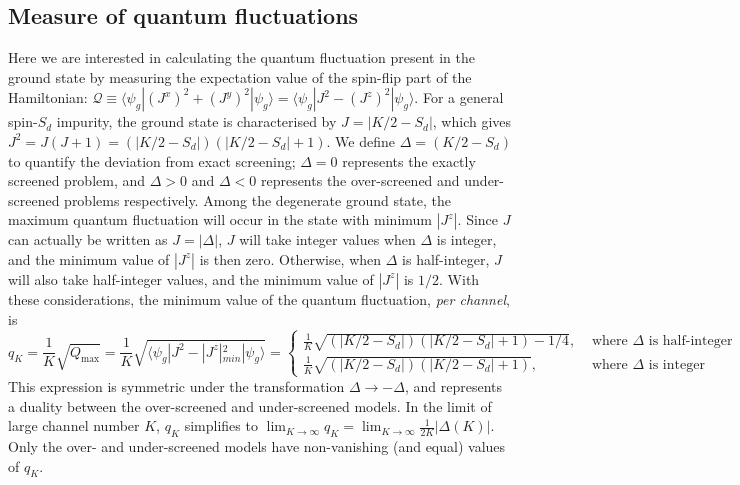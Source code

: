 \documentclass[reprint,onecolumn,prb,superscriptaddress]{revtex4-2}
\begin{document}
\subsection{Measure of quantum fluctuations}
Here we are interested in calculating the quantum fluctuation present in the  ground state by measuring the expectation value of the spin-flip part of the Hamiltonian: ${\mathcal{Q}}\equiv \langle \psi_g | (J^x)^2+(J^y)^2 |\psi_g\rangle = \langle \psi_g | J^2 - (J^z)^2 |\psi_g\rangle$. For a general spin-$S_d$ impurity, the ground state is characterised by $J=|K/2-S_d|$, which gives $J^2=J(J+1)=(|K/2-S_d|)(|K/2-S_d|+1)$. We define $\Delta=(K/2-S_d)$ to quantify the deviation from exact screening; $\Delta=0$ represents the exactly screened problem, and $\Delta>0$ and $\Delta<0$ represents the over-screened and under-screened problems respectively. Among the degenerate ground state, the maximum quantum fluctuation will occur in the state with minimum \(|J^z|\). Since \(J\) can actually be written as \(J = |\Delta|\), \(J\) will take integer values when \(\Delta\) is integer, and the minimum value of \(|J^z|\) is then zero. Otherwise, when \(\Delta\) is half-integer, \(J\) will also take half-integer values, and the minimum value of \(|J^z|\) is \(1/2\). With these considerations, the minimum value of the quantum fluctuation, {\it per channel}, is
\begin{equation}
q_K = \frac{1}{K}\sqrt{Q_\text{max}} = \frac{1}{K}\sqrt{\langle \psi_g | J^2 - |J^z|_{min}^2 |\psi_g\rangle} = \begin{cases}
	\frac{1}{K}\sqrt{(|K/2-S_d|)(|K/2-S_d|+1)-1/4}, & \text{ where }\Delta\text{ is half-integer}\\
	\frac{1}{K}\sqrt{(|K/2-S_d|)(|K/2-S_d|+1)}, & \text{ where }\Delta\text{ is integer}
\end{cases}~.
\end{equation}
This expression is symmetric under the transformation \(\Delta \to -\Delta\), and represents a duality between the over-screened and under-screened models. In the limit of large channel number \(K\), \(q_K\) simplifies to $\lim_{K\rightarrow \infty} q_K= \lim_{K \to \infty}\frac{1}{2K}|\Delta(K)|$. Only the over- and under-screened models have non-vanishing (and equal) values of \(q_K\).
\end{document}
